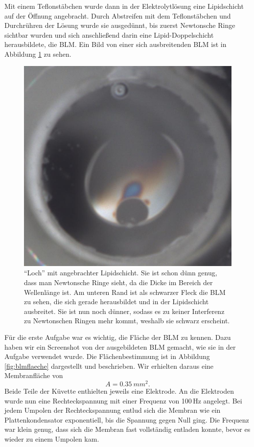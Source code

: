 \documentclass[a4paper,ngerman]{scrartcl}
\begin{document}
Mit einem Teflonstäbchen wurde dann in der Elektrolytlösung eine Lipidschicht auf der Öffnung angebracht. Durch Abstreifen mit dem 
Teflonstäbchen und Durchrühren der Lösung wurde sie ausgedünnt, bis zuerst Newtonsche Ringe sichtbar wurden und sich anschließend 
darin eine Lipid-Doppelschicht herausbildete, die BLM. Ein Bild von einer sich ausbreitenden BLM ist in Abbildung \ref{fig:newton} zu sehen.

\begin{figure}[tbh!]
  \centering
  \includegraphics[width=.4\textwidth]{abbildungen/newton2_cut.jpg}
  \caption{"`Loch"' mit angebrachter Lipidschicht. Sie ist schon dünn genug, dass man Newtonsche Ringe sieht, da die Dicke im Bereich der Wellenlänge ist. Am unteren Rand ist als schwarzer Fleck die BLM zu sehen, die sich gerade herausbildet und in der Lipidschicht ausbreitet.
Sie ist nun noch dünner, sodass es zu keiner Interferenz zu Newtonschen Ringen mehr kommt, weshalb sie schwarz erscheint.}
  \label{fig:newton}
\end{figure}
Für die erste Aufgabe war es wichtig, die Fläche der BLM zu kennen. Dazu haben wir ein Screenshot von der ausgebildeten BLM gemacht, wie sie 
in der Aufgabe verwendet wurde. Die Flächenbestimmung ist in Abbildung \ref{fig:blmflaeche} dargestellt und beschrieben. 
Wir erhielten daraus eine Membranfläche von 
\begin{equation} A = \SI{0,35}{mm^2}.\label{eq:area}\end{equation}
Beide Teile der Küvette enthielten jeweils eine Elektrode. An die Elektroden
wurde nun eine Rechteckspannung mit einer Frequenz von 100\,Hz angelegt. Bei jedem Umpolen der Rechteckspannung entlud sich die Membran wie ein Plattenkondensator exponentiell, bis die Spannung gegen Null ging. Die Frequenz war klein genug, dass sich die Membran fast vollständig entladen konnte, bevor es wieder zu einem Umpolen kam.\\
\end{document}
